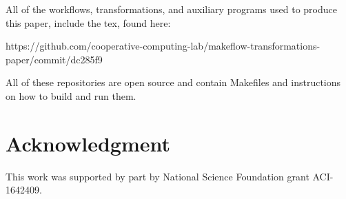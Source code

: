 \documentclass[conference]{IEEEtran}
\begin{document}
All of the workflows, transformations, and auxiliary
programs used to produce this paper, include the tex, found here:
\begin{framed}
\noindent
{\small https://github.com/cooperative-computing-lab/makeflow-transformations-paper/commit/dc285f9}
\end{framed}


All of these repositories are open source and contain Makefiles
and instructions on how to build and run them.



\section*{Acknowledgment}

This work was supported by part by National Science Foundation grant ACI-1642409.




\end{document}
